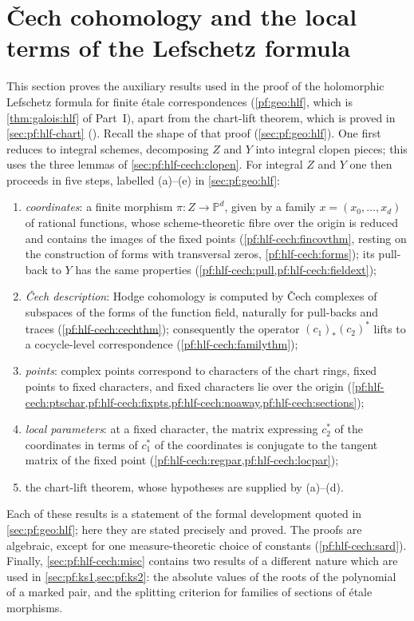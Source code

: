 \section{\v{C}ech cohomology and the local terms of the Lefschetz formula}\label{sec:pf:hlf-cech}

\providecommand{\hlfcechHdg}[3]{H^{#3}\bigl(#1,\Omega^{#2}\bigr)}

This section proves the auxiliary results used in the proof of the holomorphic Lefschetz formula for finite \'etale correspondences
(\cref{pf:geo:hlf}, which is \cref{thm:galois:hlf} of Part~I), apart from the chart-lift theorem, which is proved in \cref{sec:pf:hlf-chart}
(). Recall the shape of that proof (\cref{sec:pf:geo:hlf}). One first reduces to
integral schemes, decomposing $Z$ and $Y$ into integral clopen pieces; this uses the three lemmas of \cref{sec:pf:hlf-cech:clopen}. For integral
$Z$ and $Y$ one then proceeds in five steps, labelled (a)--(e) in \cref{sec:pf:geo:hlf}:
\begin{enumerate}[label=(\alph*),nosep]
\item \emph{coordinates}: a finite morphism $\pi\colon Z\to\mathbb P^d$, given by a family $x=(x_0,\dots,x_d)$ of rational functions, whose
  scheme-theoretic fibre over the origin is reduced and contains the images of the fixed points (\cref{pf:hlf-cech:fincovthm}, resting on the
  construction of forms with transversal zeros, \cref{pf:hlf-cech:forms}); its pull-back to $Y$ has the same properties
  (\cref{pf:hlf-cech:pull,pf:hlf-cech:fieldext});
\item \emph{\v{C}ech description}: Hodge cohomology is computed by \v{C}ech complexes of subspaces of the forms of the function field, naturally for
  pull-backs and traces (\cref{pf:hlf-cech:cechthm}); consequently the operator $(c_1)_*(c_2)^*$ lifts to a cocycle-level correspondence
  (\cref{pf:hlf-cech:familythm});
\item \emph{points}: complex points correspond to characters of the chart rings, fixed points to fixed characters, and fixed characters lie over the
  origin (\cref{pf:hlf-cech:ptschar,pf:hlf-cech:fixpts,pf:hlf-cech:noaway,pf:hlf-cech:sections});
\item \emph{local parameters}: at a fixed character, the matrix expressing $c_2^*$ of the coordinates in terms of $c_1^*$ of the coordinates is
  conjugate to the tangent matrix of the fixed point (\cref{pf:hlf-cech:regpar,pf:hlf-cech:locpar});
\item the chart-lift theorem, whose hypotheses are supplied by (a)--(d).
\end{enumerate}
Each of these results is a statement of the formal development \cite{LeanSource2026} quoted in \cref{sec:pf:geo:hlf}; here they are stated
precisely and proved. The proofs are algebraic, except for one measure-theoretic choice of constants (\cref{pf:hlf-cech:sard}). Finally,
\cref{sec:pf:hlf-cech:misc} contains two results of a different nature which are used in \cref{sec:pf:ks1,sec:pf:ks2}: the absolute values of
the roots of the polynomial of a marked pair, and the splitting criterion for families of sections of \'etale morphisms.

